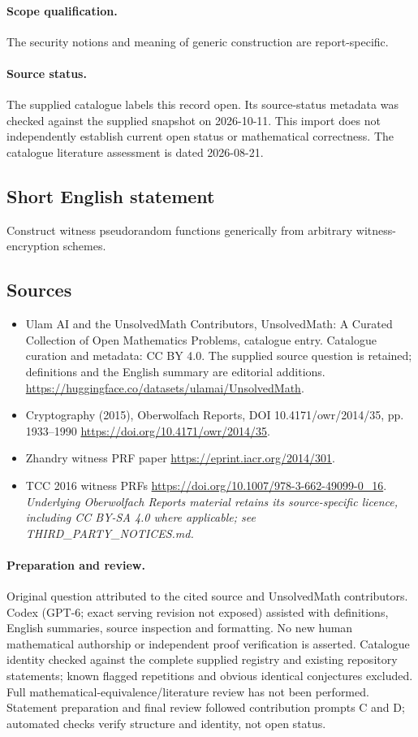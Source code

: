 \documentclass[11pt]{article}
\begin{document}
\paragraph{Scope qualification.}
The security notions and meaning of generic construction are report-specific.
\paragraph{Source status.}
The supplied catalogue labels this record open. Its source-status metadata was checked against the supplied snapshot on 2026-10-11. This import does not independently establish current open status or mathematical correctness. The catalogue literature assessment is dated 2026-08-21.
\subsection{Short English statement}
Construct witness pseudorandom functions generically from arbitrary witness-encryption schemes.
\subsection{Sources}
\begin{itemize}
\item[S1] Ulam AI and the UnsolvedMath Contributors, UnsolvedMath: A Curated Collection of Open Mathematics Problems, catalogue entry. Catalogue curation and metadata: CC BY 4.0. The supplied source question is retained; definitions and the English summary are editorial additions.
\url{https://huggingface.co/datasets/ulamai/UnsolvedMath}.
\item[S2] Cryptography (2015), Oberwolfach Reports, DOI 10.4171/owr/2014/35, pp. 1933--1990
\url{https://doi.org/10.4171/owr/2014/35}.
\item[S3] Zhandry witness PRF paper
\url{https://eprint.iacr.org/2014/301}.
\item[S4] TCC 2016 witness PRFs
\url{https://doi.org/10.1007/978-3-662-49099-0_16}.
\textit{Underlying Oberwolfach Reports material retains its source-specific licence, including CC BY-SA 4.0 where applicable; see THIRD\_PARTY\_NOTICES.md.}
\end{itemize}
\paragraph{Preparation and review.}
Original question attributed to the cited source and UnsolvedMath contributors. Codex (GPT-6; exact serving revision not exposed) assisted with definitions, English summaries, source inspection and formatting. No new human mathematical authorship or independent proof verification is asserted. Catalogue identity checked against the complete supplied registry and existing repository statements; known flagged repetitions and obvious identical conjectures excluded. Full mathematical-equivalence/literature review has not been performed. Statement preparation and final review followed contribution prompts C and D; automated checks verify structure and identity, not open status.
\label{end:statement}
\end{document}

